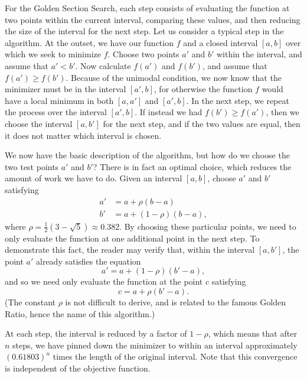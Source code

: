 For the Golden Section Search, each step consists of evaluating the function at two
points within the current interval, comparing these values, and then reducing the size
of the interval for the next step. Let us consider a typical step in the algorithm. At
the outset, we have our function $f$ and a closed interval $[a, b]$ over which we seek
to minimize $f$. Choose two points $a'$ and $b'$ within the interval, and assume that
$a' < b'$. Now calculate $f(a')$ and $f(b')$, and assume that $f(a') \geq f(b')$.
Because of the unimodal condition, we now know that the minimizer must be in the
interval $[a', b]$, for otherwise the function $f$ would have a local minimum in
both $[a, a']$ and $[a', b]$. In the next step, we repeat the process over the interval
$[a', b]$. If instead we had $f(b') \geq f(a')$, then we choose the interval $[a, b']$
for the next step, and if the two values are equal, then it does not matter which
interval is chosen.

We now have the basic description of the algorithm, but how do we choose the two test
points $a'$ and $b'$? There is in fact an optimal choice, which reduces the amount of
work we have to do. Given an interval $[a, b]$, choose $a'$ and $b'$ satisfying
\begin{align*}
a' &= a + \rho(b - a) \\
b' &= a + (1 - \rho)(b - a),
\end{align*}
where $\rho = \frac{1}{2}(3 - \sqrt{5}) \approx 0.382$. By choosing these particular
points, we need to only evaluate the function at one additional point in the next step.
To demonstrate this fact, the reader may verify that, within the interval $[a, b']$,
the point $a'$ already satisfies the equation
\begin{equation*}
a' = a + (1 - \rho)(b' - a),
\end{equation*}
and so we need only evaluate the function at the point $c$ satisfying
\begin{equation*}
c = a + \rho(b' - a).
\end{equation*}
(The constant $\rho$ is not difficult to derive, and is related to the famous Golden Ratio, hence the name of this algorithm.)

At each step, the interval is reduced by a factor of $1-\rho$, which means that after
$n$ steps, we have pinned down the minimizer to within an interval approximately
$(0.61803)^n$ times the length of the original interval. Note that this convergence is
independent of the objective function.

